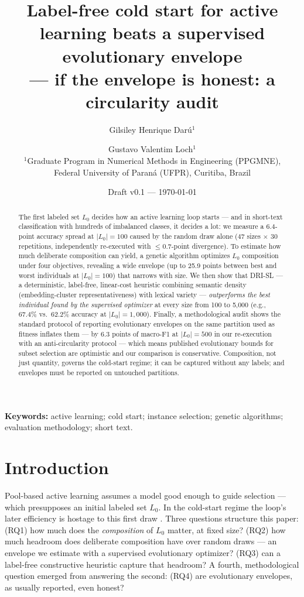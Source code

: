 \documentclass[11pt]{article}
\title{Label-free cold start for active learning beats a supervised
evolutionary envelope\\ --- if the envelope is honest: a circularity audit}
\author{Gilsiley Henrique Darú$^{1}$ \and Gustavo Valentim Loch$^{1}$\\[2pt]
\normalsize $^{1}$Graduate Program in Numerical Methods in Engineering (PPGMNE),\\
\normalsize Federal University of Paraná (UFPR), Curitiba, Brazil}
\date{Draft v0.1 --- \today}
\begin{document}
\maketitle

\begin{abstract}
The first labeled set $L_0$ decides how an active learning loop starts ---
and in short-text classification with hundreds of imbalanced classes, it
decides a lot: we measure a 6.4-point accuracy spread at $|L_0|=100$
caused by the random draw alone (47 sizes $\times$ 30 repetitions,
independently re-executed with $\le 0.7$-point divergence). To estimate
how much deliberate composition can yield, a genetic algorithm optimizes
$L_0$ composition under four objectives, revealing a wide envelope
(up to 25.9 points between best and worst individuals at $|L_0|=100$)
that narrows with size. We then show that DRI-SL --- a deterministic,
label-free, linear-cost heuristic combining semantic density
(embedding-cluster representativeness) with lexical variety ---
\emph{outperforms the best individual found by the supervised optimizer}
at every size from 100 to 5{,}000 (e.g., 67.4\% vs.\ 62.2\% accuracy at
$|L_0|=1{,}000$). Finally, a methodological audit shows the standard
protocol of reporting evolutionary envelopes on the same partition used as
fitness inflates them --- by 6.3 points of macro-F1 at $|L_0|=500$ in our
re-execution with an anti-circularity protocol --- which means published
evolutionary bounds for subset selection are optimistic and our
comparison is conservative. Composition, not just quantity, governs the
cold-start regime; it can be captured without any labels; and envelopes
must be reported on untouched partitions.
\end{abstract}

\noindent\textbf{Keywords:} active learning; cold start; instance
selection; genetic algorithms; evaluation methodology; short text.

\section{Introduction}
\label{sec:intro}

Pool-based active learning assumes a model good enough to guide selection
--- which presupposes an initial labeled set $L_0$. In the cold-start
regime the loop's later efficiency is hostage to this first draw
\citep{Bayer2024,Attenberg2010}. Three questions structure this paper:
(RQ1) how much does the \emph{composition} of $L_0$ matter, at fixed size?
(RQ2) how much headroom does deliberate composition have over random
draws --- an envelope we estimate with a supervised evolutionary
optimizer? (RQ3) can a label-free constructive heuristic capture that
headroom? A fourth, methodological question emerged from answering the
second: (RQ4) are evolutionary envelopes, as usually reported, even
honest?
\end{document}
